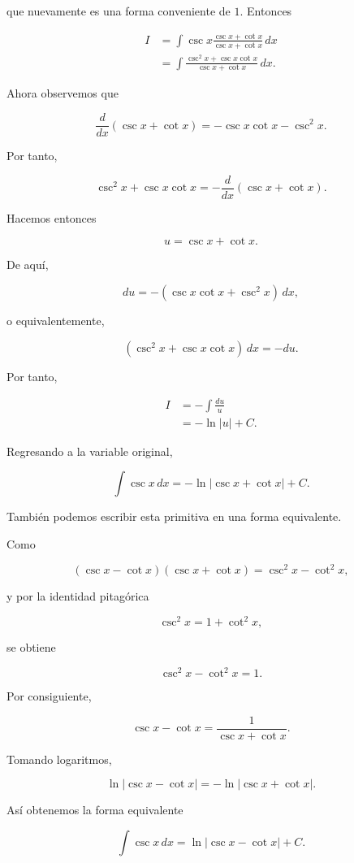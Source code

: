 \documentclass[12pt]{article}
\theoremstyle{definition}
\theoremstyle{remark}
\begin{document}
que nuevamente es una forma conveniente de \(1\). Entonces

\begin{align*}
I
&=
\int
\csc x
\frac{\csc x+\cot x}
     {\csc x+\cot x}\,dx\\[2mm]
&=
\int
\frac{\csc^2x+\csc x\cot x}
     {\csc x+\cot x}\,dx.
\end{align*}

Ahora observemos que

\[
\frac{d}{dx}(\csc x+\cot x)
=
-\csc x\cot x-\csc^2x.
\]

Por tanto,

\[
\csc^2x+\csc x\cot x
=
-\frac{d}{dx}(\csc x+\cot x).
\]

Hacemos entonces

\[
u=\csc x+\cot x.
\]

De aquí,

\[
du
=
-\left(
\csc x\cot x+\csc^2x
\right)\,dx,
\]

o equivalentemente,

\[
\left(
\csc^2x+\csc x\cot x
\right)\,dx
=
-du.
\]

Por tanto,

\begin{align*}
I
&=
-\int\frac{du}{u}\\[1mm]
&=
-\ln|u|+C.
\end{align*}

Regresando a la variable original,

\[
\boxed{
\int\csc x\,dx
=
-\ln|\csc x+\cot x|+C.
}
\]

También podemos escribir esta primitiva en una forma equivalente.

Como

\[
(\csc x-\cot x)(\csc x+\cot x)
=
\csc^2x-\cot^2x,
\]

y por la identidad pitagórica

\[
\csc^2x=1+\cot^2x,
\]

se obtiene

\[
\csc^2x-\cot^2x=1.
\]

Por consiguiente,

\[
\csc x-\cot x
=
\frac{1}{\csc x+\cot x}.
\]

Tomando logaritmos,

\[
\ln|\csc x-\cot x|
=
-\ln|\csc x+\cot x|.
\]

Así obtenemos la forma equivalente

\[
\boxed{
\int\csc x\,dx
=
\ln|\csc x-\cot x|+C.
}
\]

\end{document}

